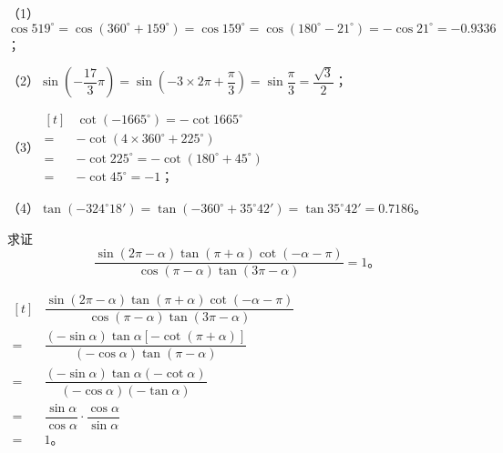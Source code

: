 \jie （1） $\cos 519^\circ = \cos(360^\circ + 159^\circ) = \cos 159^\circ = \cos(180^\circ - 21^\circ) = -\cos 21^\circ = -0.9336$；

（2）$\sin \left( -\dfrac{17}{3} \pi \right) = \sin \left( -3 \times 2\pi + \dfrac \pi 3 \right) = \sin \dfrac \pi 3 = \dfrac{\sqrt{3}}{2}$；

（3）$\begin{aligned}[t]
      &\cot(-1665^\circ) = -\cot 1665^\circ \\
    = &-\cot(4 \times 360^\circ + 225^\circ) \\
    = &-\cot 225^\circ = -\cot(180^\circ + 45^\circ) \\
    = &-\cot 45^\circ = -1 \text{；}
\end{aligned}$

（4）$\tan(-324^\circ 18') = \tan(-360^\circ + 35^\circ 42') = \tan 35^\circ 42' = 0.7186$。

\liti 求证
$$\dfrac{\sin(2\pi - \alpha) \tan(\pi + \alpha) \cot(-\alpha - \pi)}{\cos(\pi - \alpha) \tan(3\pi -\alpha)} = 1 \text{。}$$

\zhengming  $\begin{aligned}[t]
      &\dfrac{\sin(2\pi - \alpha) \tan(\pi + \alpha) \cot(-\alpha - \pi)}{\cos(\pi - \alpha) \tan(3\pi -\alpha)} \\
    = &\dfrac{(-\sin\alpha) \tan\alpha [-\cot(\pi + \alpha)]}{(-\cos\alpha) \tan(\pi - \alpha)} \\
    = &\dfrac{(-\sin\alpha) \tan\alpha (-\cot \alpha)}{(-\cos\alpha) (-\tan\alpha)} \\
    = &\dfrac{\sin\alpha}{\cos\alpha} \cdot \dfrac{\cos\alpha}{\sin\alpha} \\
    = & 1 \text{。}
\end{aligned}$

